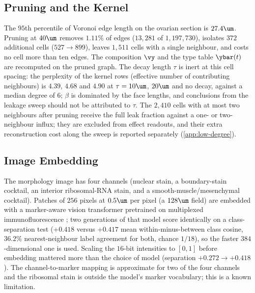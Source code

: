 \subsection{Pruning and the Kernel}
\label{app:pruning}

The $95$th percentile of Voronoi edge length on the ovarian section is $27.4\um$. Pruning at $40\um$ removes $1.11\%$ of edges ($13{,}281$ of $1{,}197{,}730$), isolates $372$ additional cells ($527 \to 899$), leaves $1{,}511$ cells with a single neighbour, and costs no cell more than ten edges. The composition $\vy$ and the type table $\ybar(t)$ are recomputed on the pruned graph. The decay length $\tau$ is inert at this cell spacing: the perplexity of the kernel rows (effective number of contributing neighbours) is $4.39$, $4.68$ and $4.90$ at $\tau = 10\um$, $20\um$ and no decay, against a median degree of $6$; $\beta$ is dominated by the face lengths, and conclusions from the leakage sweep should not be attributed to $\tau$. The $2{,}410$ cells with at most two neighbours after pruning receive the full leak fraction against a one- or two-neighbour influx; they are excluded from effect readouts, and their extra reconstruction cost along the sweep is reported separately (\cref{app:low-degree}).

\subsection{Image Embedding}
\label{app:image}

The morphology image has four channels (nuclear stain, a boundary-stain cocktail, an interior ribosomal-RNA stain, and a smooth-muscle/mesenchymal cocktail). Patches of $256$ pixels at $0.5\um$ per pixel (a $128\um$ field) are embedded with a marker-aware vision transformer \citep{dosovitskiy2021} pretrained on multiplexed immunofluorescence \citep{kronos2025}; two generations of that model score identically on a class-separation test ($+0.418$ versus $+0.417$ mean within-minus-between class cosine, $36.2\%$ nearest-neighbour label agreement for both, chance $1/18$), so the faster $384$-dimensional one is used. Scaling the $16$-bit intensities to $[0,1]$ before embedding mattered more than the choice of model (separation $+0.272 \to +0.418$). The channel-to-marker mapping is approximate for two of the four channels and the ribosomal stain is outside the model's marker vocabulary; this is a known limitation. 

